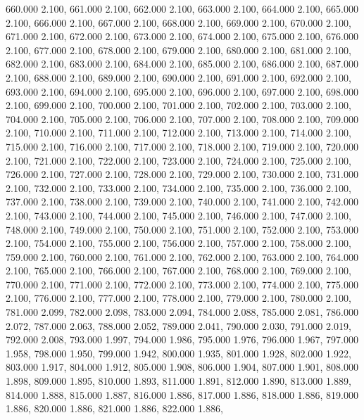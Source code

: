 660.000 2.100, 
661.000 2.100, 
662.000 2.100, 
663.000 2.100, 
664.000 2.100, 
665.000 2.100, 
666.000 2.100, 
667.000 2.100, 
668.000 2.100, 
669.000 2.100, 
670.000 2.100, 
671.000 2.100, 
672.000 2.100, 
673.000 2.100, 
674.000 2.100, 
675.000 2.100, 
676.000 2.100, 
677.000 2.100, 
678.000 2.100, 
679.000 2.100, 
680.000 2.100, 
681.000 2.100, 
682.000 2.100, 
683.000 2.100, 
684.000 2.100, 
685.000 2.100, 
686.000 2.100, 
687.000 2.100, 
688.000 2.100, 
689.000 2.100, 
690.000 2.100, 
691.000 2.100, 
692.000 2.100, 
693.000 2.100, 
694.000 2.100, 
695.000 2.100, 
696.000 2.100, 
697.000 2.100, 
698.000 2.100, 
699.000 2.100, 
700.000 2.100, 
701.000 2.100, 
702.000 2.100, 
703.000 2.100, 
704.000 2.100, 
705.000 2.100, 
706.000 2.100, 
707.000 2.100, 
708.000 2.100, 
709.000 2.100, 
710.000 2.100, 
711.000 2.100, 
712.000 2.100, 
713.000 2.100, 
714.000 2.100, 
715.000 2.100, 
716.000 2.100, 
717.000 2.100, 
718.000 2.100, 
719.000 2.100, 
720.000 2.100, 
721.000 2.100, 
722.000 2.100, 
723.000 2.100, 
724.000 2.100, 
725.000 2.100, 
726.000 2.100, 
727.000 2.100, 
728.000 2.100, 
729.000 2.100, 
730.000 2.100, 
731.000 2.100, 
732.000 2.100, 
733.000 2.100, 
734.000 2.100, 
735.000 2.100, 
736.000 2.100, 
737.000 2.100, 
738.000 2.100, 
739.000 2.100, 
740.000 2.100, 
741.000 2.100, 
742.000 2.100, 
743.000 2.100, 
744.000 2.100, 
745.000 2.100, 
746.000 2.100, 
747.000 2.100, 
748.000 2.100, 
749.000 2.100, 
750.000 2.100, 
751.000 2.100, 
752.000 2.100, 
753.000 2.100, 
754.000 2.100, 
755.000 2.100, 
756.000 2.100, 
757.000 2.100, 
758.000 2.100, 
759.000 2.100, 
760.000 2.100, 
761.000 2.100, 
762.000 2.100, 
763.000 2.100, 
764.000 2.100, 
765.000 2.100, 
766.000 2.100, 
767.000 2.100, 
768.000 2.100, 
769.000 2.100, 
770.000 2.100, 
771.000 2.100, 
772.000 2.100, 
773.000 2.100, 
774.000 2.100, 
775.000 2.100, 
776.000 2.100, 
777.000 2.100, 
778.000 2.100, 
779.000 2.100, 
780.000 2.100, 
781.000 2.099, 
782.000 2.098, 
783.000 2.094, 
784.000 2.088, 
785.000 2.081, 
786.000 2.072, 
787.000 2.063, 
788.000 2.052, 
789.000 2.041, 
790.000 2.030, 
791.000 2.019, 
792.000 2.008, 
793.000 1.997, 
794.000 1.986, 
795.000 1.976, 
796.000 1.967, 
797.000 1.958, 
798.000 1.950, 
799.000 1.942, 
800.000 1.935, 
801.000 1.928, 
802.000 1.922, 
803.000 1.917, 
804.000 1.912, 
805.000 1.908, 
806.000 1.904, 
807.000 1.901, 
808.000 1.898, 
809.000 1.895, 
810.000 1.893, 
811.000 1.891, 
812.000 1.890, 
813.000 1.889, 
814.000 1.888, 
815.000 1.887, 
816.000 1.886, 
817.000 1.886, 
818.000 1.886, 
819.000 1.886, 
820.000 1.886, 
821.000 1.886, 
822.000 1.886, 

